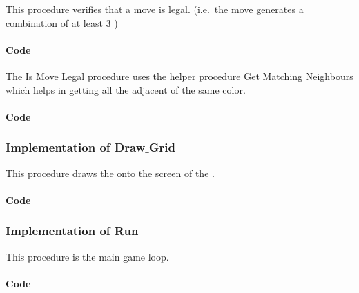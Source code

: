 This procedure verifies that a move is legal. (i.e.\  the move generates a combination of at least 3 \sqs)

\paragraph{Code}
\noindent
\begin{centering}

\end{centering}
\newpage

The Is$\_$Move$\_$Legal procedure uses the helper procedure Get$\_$Matching$\_$Neighbours which helps in getting all the adjacent \sqs of the same color.

\paragraph{Code}
\noindent
\begin{centering}

\end{centering}
\newpage

\subsubsection{Implementation of Draw$\_$Grid}

This procedure draws the \grid onto the screen of the \stmdb.

\paragraph{Code}
\noindent
\begin{centering}

\end{centering}
\newpage

\subsubsection{Implementation of Run}

This procedure is the main game loop.

\paragraph{Code}
\begin{centering}

\end{centering}
\newpage
